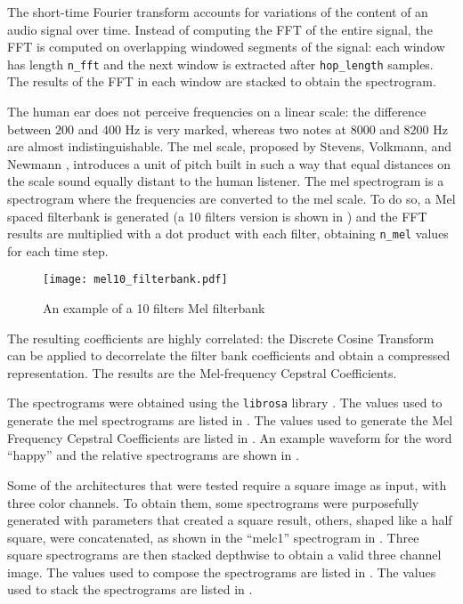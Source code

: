 The short-time Fourier transform accounts for variations of the content of an
audio signal over time. Instead of computing the FFT of the entire signal, the
FFT is computed on overlapping windowed segments of the signal: each window has
length \texttt{n\_fft} and the next window is extracted after
\texttt{hop\_length} samples.
The results of the FFT in each window are stacked to obtain the spectrogram.

The human ear does not perceive frequencies on a linear scale: the difference
between $200$ and $400$ Hz is very marked, whereas two notes at $8000$ and
$8200$ Hz are almost indistinguishable. The mel scale, proposed by Stevens,
Volkmann, and Newmann \cite{melscale1937}, introduces a unit of pitch built in
such a way that equal distances on the scale sound equally distant to the human
listener.
The mel spectrogram is a spectrogram where the frequencies are converted to the
mel scale. To do so, a Mel spaced filterbank is generated (a 10 filters version
is shown in ) and the FFT results are multiplied with
a dot product with each filter, obtaining \texttt{n\_mel} values for each
time step.

\begin{figure}[t!]
    \centering
    \texttt{[image: mel10\_filterbank.pdf]}
    \caption{An example of a 10 filters Mel filterbank}
    \label{fig:mel10_filterbank}
\end{figure}

The resulting coefficients are highly correlated: the Discrete Cosine Transform
can be applied to decorrelate the filter bank coefficients and obtain a
compressed representation.
The results are the Mel-frequency Cepstral Coefficients.

The spectrograms were obtained using the \texttt{librosa} library
\cite{brian_mcfee_2020_3955228}.
The values used to generate the mel spectrograms are listed in
.
The values used to generate the Mel Frequency Cepstral Coefficients are listed
in .
An example waveform for the word ``happy'' and the relative spectrograms are
shown in .

Some of the architectures that were tested require a square image as input,
with three color channels.
To obtain them, some spectrograms were purposefully generated with parameters
that created a square result, others, shaped like a half square, were
concatenated, as shown in the ``melc1'' spectrogram in
.
Three square spectrograms are then stacked depthwise to obtain a valid three
channel image.
The values used to compose the spectrograms are listed in .
The values used to stack the spectrograms are listed in .

